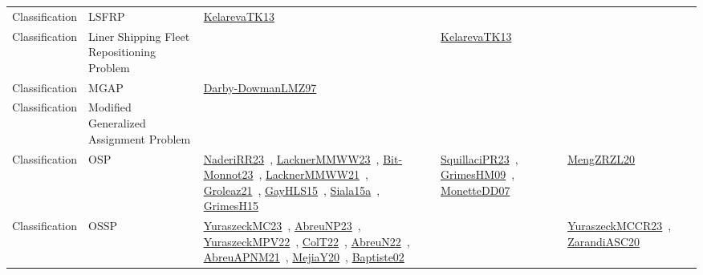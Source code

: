 {\begin{longtable}{lp{3cm}>{\raggedright\arraybackslash}p{6cm}>{\raggedright\arraybackslash}p{6cm}>{\raggedright\arraybackslash}p{8cm}}
Classification & LSFRP & \href{works/KelarevaTK13.pdf}{KelarevaTK13}~\cite{KelarevaTK13} &  & \\
Classification & Liner Shipping Fleet Repositioning Problem &  & \href{works/KelarevaTK13.pdf}{KelarevaTK13}~\cite{KelarevaTK13} & \\
Classification & MGAP & \href{works/Darby-DowmanLMZ97.pdf}{Darby-DowmanLMZ97}~\cite{Darby-DowmanLMZ97} &  & \\
Classification & Modified Generalized Assignment Problem &  &  & \\
Classification & OSP & \href{works/NaderiRR23.pdf}{NaderiRR23}~\cite{NaderiRR23}, \href{works/LacknerMMWW23.pdf}{LacknerMMWW23}~\cite{LacknerMMWW23}, \href{works/Bit-Monnot23.pdf}{Bit-Monnot23}~\cite{Bit-Monnot23}, \href{works/LacknerMMWW21.pdf}{LacknerMMWW21}~\cite{LacknerMMWW21}, \href{works/Groleaz21.pdf}{Groleaz21}~\cite{Groleaz21}, \href{works/GayHLS15.pdf}{GayHLS15}~\cite{GayHLS15}, \href{works/Siala15a.pdf}{Siala15a}~\cite{Siala15a}, \href{works/GrimesH15.pdf}{GrimesH15}~\cite{GrimesH15} & \href{works/SquillaciPR23.pdf}{SquillaciPR23}~\cite{SquillaciPR23}, \href{works/GrimesHM09.pdf}{GrimesHM09}~\cite{GrimesHM09}, \href{works/MonetteDD07.pdf}{MonetteDD07}~\cite{MonetteDD07} & \href{works/MengZRZL20.pdf}{MengZRZL20}~\cite{MengZRZL20}\\
Classification & OSSP & \href{works/YuraszeckMC23.pdf}{YuraszeckMC23}~\cite{YuraszeckMC23}, \href{works/AbreuNP23.pdf}{AbreuNP23}~\cite{AbreuNP23}, \href{works/YuraszeckMPV22.pdf}{YuraszeckMPV22}~\cite{YuraszeckMPV22}, \href{works/ColT22.pdf}{ColT22}~\cite{ColT22}, \href{works/AbreuN22.pdf}{AbreuN22}~\cite{AbreuN22}, \href{works/AbreuAPNM21.pdf}{AbreuAPNM21}~\cite{AbreuAPNM21}, \href{works/MejiaY20.pdf}{MejiaY20}~\cite{MejiaY20}, \href{works/Baptiste02.pdf}{Baptiste02}~\cite{Baptiste02} &  & \href{works/YuraszeckMCCR23.pdf}{YuraszeckMCCR23}~\cite{YuraszeckMCCR23}, \href{works/ZarandiASC20.pdf}{ZarandiASC20}~\cite{ZarandiASC20}\\

\end{longtable}}
